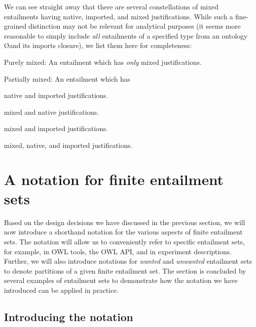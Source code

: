 We can see straight away that there are several constellations of mixed entailments having native, imported, and mixed justifications. While such a fine-grained distinction may not be relevant for analytical purposes (it seems more reasonable to simply include \emph{all} entailments of a specified type from an ontology \O and its imports closure), we list them here for completeness:
\begin{compactenum}
\item Purely mixed: An entailment which has \emph{only} mixed justifications.
\item Partially mixed: An entailment which has
\begin{compactenum}[a)]
\item native and imported justifications.
\item mixed and native justifications.
\item mixed and imported justifications.
\item mixed, native, and imported justifications.
\end{compactenum}
\end{compactenum}

\section{A notation for finite entailment sets}

Based on the design decisions we have discussed in the previous section, we will now introduce a shorthand notation for the various aspects of finite entailment sets. The notation will allow us to conveniently refer to specific entailment sets, for example, in OWL tools, the OWL API, and in experiment descriptions. Further, we will also introduce notations for \emph{wanted} and \emph{unwanted} entailment sets to denote partitions of a given finite entailment set. The section is concluded by several examples of entailment sets to demonstrate how the notation we have introduced can be applied in practice.

\subsection{Introducing the notation}


